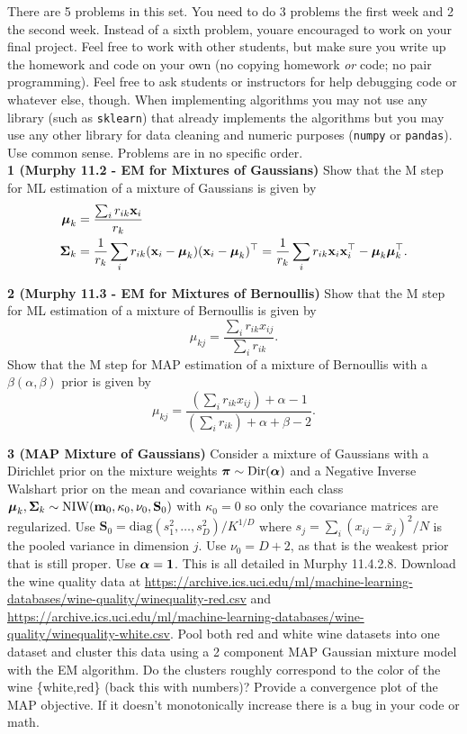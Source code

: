 \documentclass[12pt,letterpaper,fleqn]{hmcpset}
\begin{document}
There are 5 problems in this set. You need to do 3 problems the first week and 2 the second
week. Instead of a sixth problem, youare encouraged to work on your final project.
Feel free to work with other students, but make sure you write up the homework
and code on your own (no copying homework \textit{or} code; no pair programming).
Feel free to ask students or instructors for help debugging code or whatever else,
though.
When implementing algorithms you may not use any library (such as \texttt{sklearn})
that already implements the algorithms but you may use any other library for
data cleaning and numeric purposes (\texttt{numpy} or \texttt{pandas}). Use common
sense. Problems are in no specific order.\\[1em]

\textbf{1 (Murphy 11.2 - EM for Mixtures of Gaussians)} Show that the M step for ML
estimation of a mixture of Gaussians is given by
\begin{align*}
    \hbox{\boldmath$\mu$}_k &= \frac{\sum_i r_{ik}{\bf x}_i}{r_k}\\
\hbox{\boldmath$\Sigma$}_k &= \frac{1}{r_k}\sum_i r_{ik}({\bf x}_i - \hbox{\boldmath$\mu$}_k)({\bf x}_i - \hbox{\boldmath$\mu$}_k)^\top = \frac{1}{r_k}\sum_i r_{ik}{\bf x}_i{\bf x}_i^\top - \hbox{\boldmath$\mu$}_k\hbox{\boldmath$\mu$}_k^\top.
\end{align*}

\textbf{2 (Murphy 11.3 - EM for Mixtures of Bernoullis)} Show that the M step for ML estimation
of a mixture of Bernoullis is given by
\[
    \mu_{kj} = \frac{\sum_i r_{ik}x_{ij}}{\sum_i r_{ik}}.
\]
Show that the M step for MAP estimation of a mixture of Bernoullis with a $\beta(\alpha,\beta)$ prior
is given by
\[
    \mu_{kj} = \frac{\left(\sum_i r_{ik}x_{ij}\right) + \alpha - 1}{\left(\sum_i r_{ik}\right) + \alpha + \beta - 2}.
\]

\textbf{3 (MAP Mixture of Gaussians)} Consider a mixture of Gaussians with a Dirichlet prior on the
mixture weights $\hbox{\boldmath$\pi$} \sim \mathrm{Dir}(\hbox{\boldmath$\alpha$})$ and a Negative Inverse Walshart prior on the
mean and covariance within each class
$\hbox{\boldmath$\mu$}_k,\hbox{\boldmath$\Sigma$}_k \sim \mathrm{NIW}(\mathbf{m}_0,\kappa_0,\nu_0,\mathbf{S}_0)$ with $\kappa_0=0$ so
only the covariance matrices are regularized. Use $\mathbf{S}_0 = \mathrm{diag}(s_1^2,\dots,s_D^2)/K^{1/D}$
where $s_j = \sum_i(x_{ij} - \overline{x}_j)^2/N$ is the pooled variance in dimension $j$. Use $\nu_0 = D + 2$,
as that is the weakest prior that is still proper. Use $\hbox{\boldmath$\alpha$} = {\bf 1}$. This is all detailed in Murphy 11.4.2.8. Download the
wine quality data at \url{https://archive.ics.uci.edu/ml/machine-learning-databases/wine-quality/winequality-red.csv}
and \url{https://archive.ics.uci.edu/ml/machine-learning-databases/wine-quality/winequality-white.csv}. Pool both
red and white wine datasets into one dataset and cluster this data using a 2 component MAP Gaussian mixture model
with the EM algorithm. Do the clusters roughly correspond to the color of the wine \{white,red\} (back this with
numbers)? Provide a convergence plot of the MAP objective. If it doesn't monotonically increase there is a bug
in your code or math.
\end{document}
